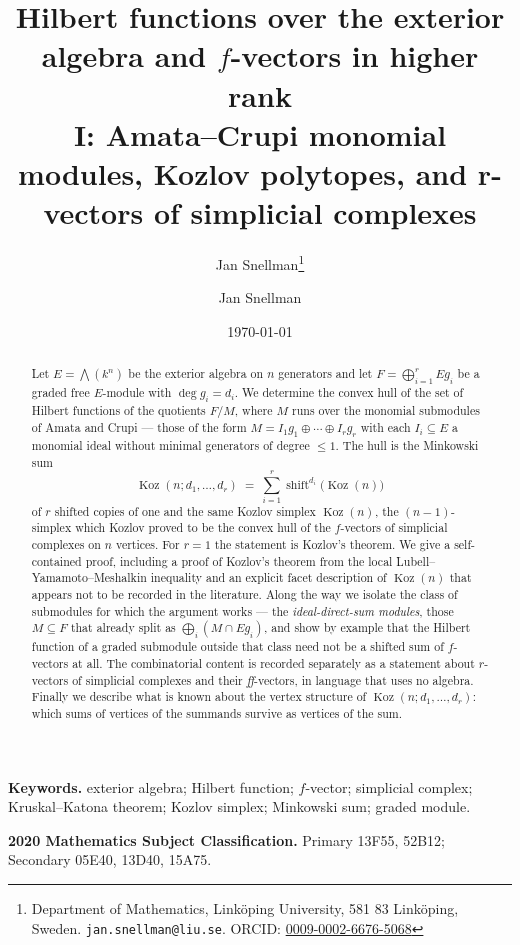 \documentclass[11pt, a4paper, abstract=yes]{scrartcl}
\author{Jan Snellman\thanks{Department of Mathematics, Linköping University, 581 83 Linköping, Sweden. \texttt{jan.snellman@liu.se}. ORCID: \href{https://orcid.org/0009-0002-6676-5068}{0009-0002-6676-5068}}}
\author{Jan Snellman \orcidlink{0009-0002-6676-5068}}
\date{\today}
\title{Hilbert functions over the exterior algebra and \(f\)-vectors in higher rank\\\medskip
\large I: Amata--Crupi monomial modules, Kozlov polytopes, and r-vectors of simplicial complexes}
\theoremstyle{definition}
\theoremstyle{remark}
\theoremstyle{plain}
\newcommand{\Koz}{\operatorname{Koz}}
\newcommand{\shift}{\operatorname{shift}}
\begin{document}
\maketitle
\begin{abstract}
Let \(E=\bigwedge(k^n)\) be the exterior algebra on \(n\) generators and let
\(F=\bigoplus_{i=1}^{r}Eg_i\) be a graded free \(E\)-module with \(\deg g_i=d_i\). We determine the
convex hull of the set of Hilbert functions of the quotients \(F/M\), where \(M\) runs over the
monomial submodules of Amata and Crupi --- those of the form \(M=I_1g_1\oplus\cdots\oplus I_rg_r\)
with each \(I_i\subseteq E\) a monomial ideal without minimal generators of degree \(\le1\). The
hull is the Minkowski sum
\begin{equation}\label{eq:eq}
  \Koz(n;d_1,\dots,d_r)\;=\;\sum_{i=1}^{r}\shift^{d_i}\bigl(\Koz(n)\bigr)
\end{equation}
of \(r\) shifted copies of one and the same Kozlov simplex \(\Koz(n)\), the \((n-1)\)-simplex which
Kozlov proved \autocite{Kozlov1997} to be the convex hull of the \(f\)-vectors of simplicial complexes on \(n\)
vertices. For \(r=1\) the statement is Kozlov's theorem. We give a self-contained proof, including a
proof of Kozlov's theorem from the local Lubell--Yamamoto--Meshalkin inequality and an explicit
facet description of \(\Koz(n)\) that appears not to be recorded in the literature. Along the way we
isolate the class of submodules for which the argument works --- the \emph{ideal-direct-sum modules},
those \(M\subseteq F\) that already split as \(\bigoplus_i(M\cap Eg_i)\), and show by example that
the Hilbert function of a graded submodule outside that class need not be a shifted sum of
\(f\)-vectors at all. The combinatorial content is recorded separately as a statement about
\(r\)-vectors of simplicial complexes and their \emph{ff}-vectors, in language that uses no algebra.
Finally we describe what is known about the vertex structure of \(\Koz(n;d_1,\dots,d_r)\): which
sums of vertices of the summands survive as vertices of the sum.
\end{abstract}

\medskip\noindent\textbf{Keywords.} exterior algebra; Hilbert function; \(f\)-vector; simplicial
complex; Kruskal--Katona theorem; Kozlov simplex; Minkowski sum; graded module.

\smallskip\noindent\textbf{2020 Mathematics Subject Classification.} Primary 13F55, 52B12;
Secondary 05E40, 13D40, 15A75.
\medskip

\setcounter{tocdepth}{2}
\tableofcontents
\end{document}
